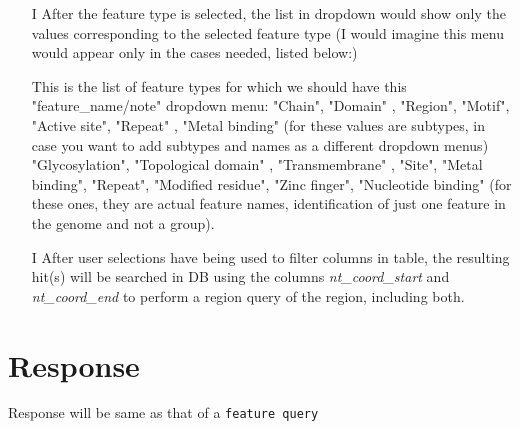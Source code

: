 \documentclass[a4paper, 10pt]{article}
\begin{document}
\begin{itemize}
 \item[I] After the feature type is selected, the list in dropdown would show only the values corresponding to the selected feature type (I would imagine this menu would appear only in the cases needed, listed below:) 

This is the list of feature types for which we should have this "feature\_name/note" dropdown menu:
"Chain", "Domain" , "Region", "Motif", "Active site", "Repeat" , "Metal binding"  (for these values are subtypes, in case you want to add subtypes and names as a different dropdown menus)
"Glycosylation", "Topological domain" , "Transmembrane" , "Site", "Metal binding", "Repeat", "Modified residue", "Zinc finger", "Nucleotide binding" (for these ones, they are actual feature names, identification of just one feature in the genome and not a group).






\item[I] After user selections have being used to filter columns in table, the resulting hit(s) will be searched in DB using the columns \textit{nt\_coord\_start} and \textit{nt\_coord\_end} to perform a region query of the region, including both.

\end{itemize}









\section{Response}
Response will be same as that of a \texttt{feature query} 
\end{document}
